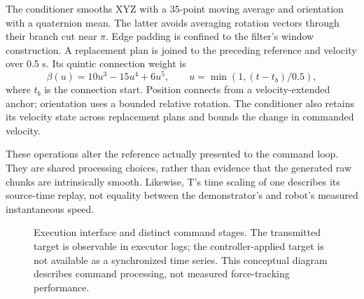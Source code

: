 The conditioner smooths XYZ with a 35-point moving average and orientation with a quaternion mean. The latter avoids averaging rotation vectors through their branch cut near \(\pi\). Edge padding is confined to the filter's window construction. A replacement plan is joined to the preceding reference and velocity over 0.5 s. Its quintic connection weight is
\begin{equation}
 \beta(u)=10u^3-15u^4+6u^5,\qquad
 u=\min(1,(t-t_b)/0.5),
 \label{eq:plan_connection}
\end{equation}
where \(t_b\) is the connection start. Position connects from a velocity-extended anchor; orientation uses a bounded relative rotation. The conditioner also retains its velocity state across replacement plans and bounds the change in commanded velocity.

These operations alter the reference actually presented to the command loop. They are shared processing choices, rather than evidence that the generated raw chunks are intrinsically smooth. Likewise, T's time scaling of one describes its source-time replay, not equality between the demonstrator's and robot's measured instantaneous speed.

\begin{figure}[tbp]\centering
{}
\caption[Command processing and contact execution]{Execution interface and distinct command stages. The transmitted target is observable in executor logs; the controller-applied target is not available as a synchronized time series. This conceptual diagram describes command processing, not measured force-tracking performance.}
\label{fig:execution_architecture}
\end{figure}

